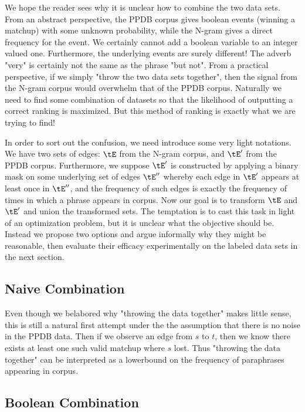 We hope the reader sees why it is unclear how to combine the two data sets. From an abstract perspective, the PPDB corpus gives boolean events (winning a matchup) with some unknown probability, while the N-gram gives a direct frequency for the event. We certainly cannot add a boolean variable to an integer valued one. Furthermore, the underlying events are surely different! The adverb "very" is certainly not the same as the phrase "but not". From a practical perspective, if we simply "throw the two data sets together", then the signal from the N-gram corpus would overwhelm that of the PPDB corpus. Naturally we need to find some combination of datasets so that the likelihood of outputting a correct ranking is maximized. But this method of ranking is exactly what we are trying to find! 

In order to sort out the confusion, we need introduce some very light notations. We have two sets of edges: $\tE$ from the N-gram corpus, and $\tE'$ from the PPDB corpus. Furthermore, we suppose $\tE'$ is constructed by applying a binary mask on some underlying set of edges $\tE''$ whereby each edge in $\tE'$ appears at least once in $\tE''$, and the frequency of such edges is exactly the frequency of times in which a phrase appears in corpus. Now our goal is to transform $\tE$ and $\tE'$ and union the transformed sets. The temptation is to cast this task in light of an optimization problem, but it is unclear what the objective should be. Instead we propose two options and argue informally why they might be reasonable, then evaluate their efficacy experimentally on the labeled data sets in the next section. 

\subsection{Naive Combination}

Even though we belabored why "throwing the data together" makes little sense, this is still a natural first attempt under the the assumption that there is no noise in the PPDB data. Then if we observe an edge from $s$ to $t$, then we know there exists at least one such valid matchup where $s$ lost. Thus "throwing the data together" can be interpreted as a lowerbound on the frequency of paraphrases appearing in corpus.

\subsection{Boolean Combination}

